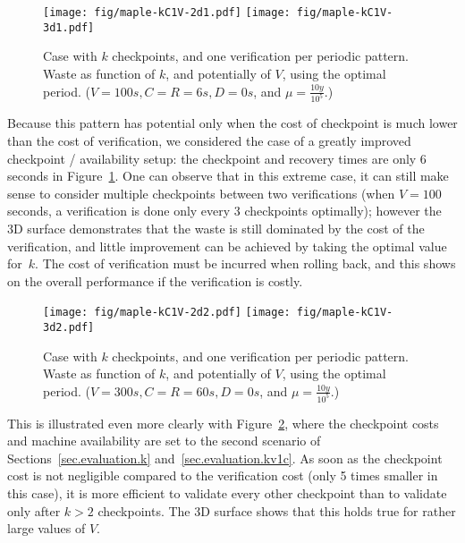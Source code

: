 \documentclass[10pt,table]{article}
\newcommand{\ema}[1]{\ensuremath{#1}\xspace}
\newcommand{\ccc}{\ema{C}}
\newcommand{\rrr}{\ema{R}}
\newcommand{\ddd}{\ema{D}}
\newcommand{\vvv}{\ema{V}}
\newcommand{\muplatform}{\mu}
\begin{document}
\begin{figure}
\begin{center}
\texttt{[image: fig/maple-kC1V-2d1.pdf]}
\texttt{[image: fig/maple-kC1V-3d1.pdf]}
\caption{Case with $k$ checkpoints, and one verification per periodic
  pattern. Waste as function of $k$, and potentially of $V$, using the
  optimal period.  \footnotesize{($\vvv=100s, \ccc=\rrr=6s, \ddd=0s$,
    and $\muplatform = \frac{10y}{10^5}$.)}
\label{fig:maple:kC1V1}\vspace{-\baselineskip}}
\end{center}
\end{figure}

Because this pattern has potential only when the cost of checkpoint is
much lower than the cost of verification, we considered the case of a
greatly improved checkpoint / availability setup: the checkpoint and
recovery times are only $6$ seconds in
Figure~\ref{fig:maple:kC1V1}. One can observe that in this extreme
case, it can still make sense to consider multiple checkpoints between
two verifications (when $\vvv=100$ seconds, a verification is done
only every 3 checkpoints optimally); however the 3D surface
demonstrates that the waste is still dominated by the cost of the
verification, and little improvement can be achieved by taking the
optimal value for~$k$. The cost of verification must be incurred when rolling
back, and this shows on the overall performance if the verification is
costly.

\begin{figure}
\begin{center}
\texttt{[image: fig/maple-kC1V-2d2.pdf]}
\texttt{[image: fig/maple-kC1V-3d2.pdf]}
\caption{Case with $k$ checkpoints, and one verification per periodic
  pattern. Waste as function of $k$, and potentially of $V$, using the
  optimal period.  \footnotesize{($\vvv=300s, \ccc=\rrr=60s, \ddd=0s$,
    and $\muplatform = \frac{10y}{10^5}$.)}
\label{fig:maple:kC1V2}\vspace{-2\baselineskip}}
\end{center}
\end{figure}

This is illustrated even more clearly with Figure~\ref{fig:maple:kC1V2}, 
where the checkpoint costs and machine
availability are set to the second scenario of 
Sections~\ref{sec.evaluation.k} and~\ref{sec.evaluation.kv1c}. 
As soon as the checkpoint cost is not negligible compared to
the verification cost (only 5 times smaller in this case), it is more
efficient to validate every other checkpoint than to validate only after
$k > 2$ checkpoints. The 3D surface shows
that this holds true for rather large values of \vvv.
\end{document}
